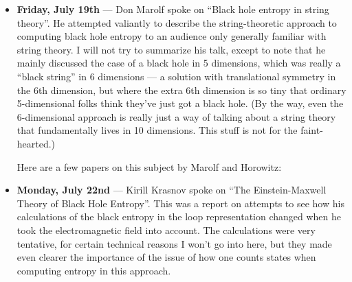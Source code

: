 \documentclass{article}
\renewcommand{\texttt}[1]{%
  \begingroup
  \ttfamily
  \begingroup\lccode`~=`/\lowercase{\endgroup\def~}{/\discretionary{}{}{}}%
  \begingroup\lccode`~=`[\lowercase{\endgroup\def~}{[\discretionary{}{}{}}%
  \begingroup\lccode`~=`.\lowercase{\endgroup\def~}{.\discretionary{}{}{}}%
  \catcode`/=\active\catcode`[=\active\catcode`.=\active
  \scantokens{#1\noexpand}%
  \endgroup
}
\begin{document}
\begin{itemize}
\item
  \textbf{Friday, July 19th} --- Don Marolf spoke on ``Black hole
  entropy in string theory''. He attempted valiantly to describe the
  string-theoretic approach to computing black hole entropy to an
  audience only generally familiar with string theory. I will not try to
  summarize his talk, except to note that he mainly discussed the case
  of a black hole in 5 dimensions, which was really a ``black string''
  in 6 dimensions --- a solution with translational symmetry in the 6th
  dimension, but where the extra 6th dimension is so tiny that ordinary
  5-dimensional folks think they've just got a black hole. (By the way,
  even the 6-dimensional approach is really just a way of talking about
  a string theory that fundamentally lives in 10 dimensions. This stuff
  is not for the faint-hearted.)

  Here are a few papers on this subject by Marolf and Horowitz:

\item
  \textbf{Monday, July 22nd} --- Kirill Krasnov spoke on ``The
  Einstein-Maxwell Theory of Black Hole Entropy''. This was a report on
  attempts to see how his calculations of the black entropy in the loop
  representation changed when he took the electromagnetic field into
  account. The calculations were very tentative, for certain technical
  reasons I won't go into here, but they made even clearer the
  importance of the issue of how one counts states when computing
  entropy in this approach.


\end{itemize}
\end{document}
